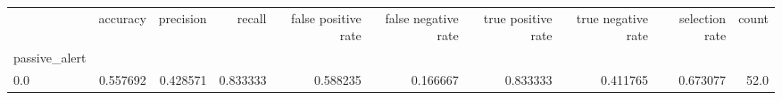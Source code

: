 \begin{tabular}{lrrrrrrrrr}
\toprule
{} &  accuracy &  precision &    recall &  false positive rate &  false negative rate &  true positive rate &  true negative rate &  selection rate &  count \\
passive\_alert &           &            &           &                      &                      &                     &                     &                 &        \\
\midrule
0.0           &  0.557692 &   0.428571 &  0.833333 &             0.588235 &             0.166667 &            0.833333 &            0.411765 &        0.673077 &   52.0 \\
\bottomrule
\end{tabular}

